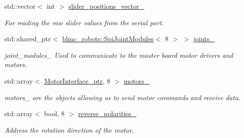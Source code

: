 \begin{DoxyCompactItemize}
\mbox{\label{classblmc__robots_1_1Solo8_ae8717ecb7e21391ef5f54d67e0e46b5d}} 
std\+::vector$<$ int $>$ \hyperlink{classblmc__robots_1_1Solo8_ae8717ecb7e21391ef5f54d67e0e46b5d}{slider\+\_\+positions\+\_\+vector\+\_\+}
\begin{DoxyCompactList}\small\item\em For reading the raw slider values from the serial port. \end{DoxyCompactList}\item 
\mbox{\label{classblmc__robots_1_1Solo8_aaca553f0634f406d2e41a0499dedd73a}} 
std\+::shared\+\_\+ptr$<$ \hyperlink{classblmc__robots_1_1SpiJointModules}{blmc\+\_\+robots\+::\+Spi\+Joint\+Modules}$<$ 8 $>$ $>$ \hyperlink{classblmc__robots_1_1Solo8_aaca553f0634f406d2e41a0499dedd73a}{joints\+\_\+}
\begin{DoxyCompactList}\small\item\em joint\+\_\+modules\+\_\+ Used to communicate to the master board motor drivers and motors. \end{DoxyCompactList}\item 
\mbox{\label{classblmc__robots_1_1Solo8_a4d0b9f094d69f0acbdcbc7728df6ecd4}} 
std\+::array$<$ \hyperlink{common__header_8hpp_ae1a0f9992bc8fbbc1943d887f517c180}{Motor\+Interface\+\_\+ptr}, 8 $>$ \hyperlink{classblmc__robots_1_1Solo8_a4d0b9f094d69f0acbdcbc7728df6ecd4}{motors\+\_\+}
\begin{DoxyCompactList}\small\item\em motors\+\_\+ are the objects allowing us to send motor commands and receive data. \end{DoxyCompactList}\item 
\mbox{\label{classblmc__robots_1_1Solo8_af8e3d6a86608540f39bf1de1f052266a}} 
std\+::array$<$ bool, 8 $>$ \hyperlink{classblmc__robots_1_1Solo8_af8e3d6a86608540f39bf1de1f052266a}{reverse\+\_\+polarities\+\_\+}
\begin{DoxyCompactList}\small\item\em Address the rotation direction of the motor. \end{DoxyCompactList}\item 
\mbox{\label{classblmc__robots_1_1Solo8_a4f372b7f79a81142a4e99e1ae6da44a2}} 

\end{DoxyCompactItemize}
